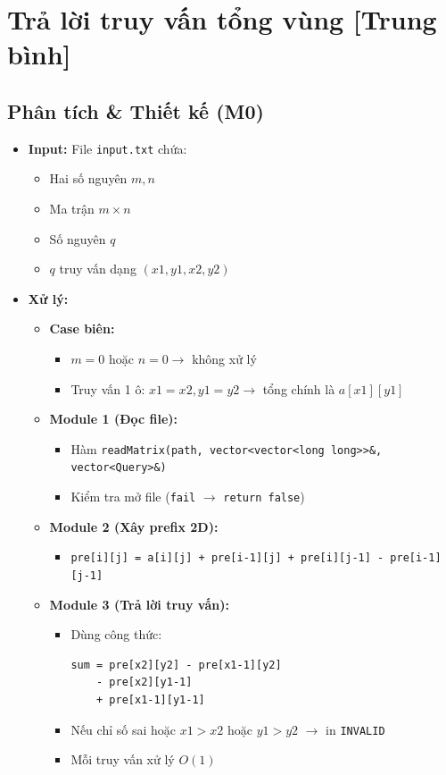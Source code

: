 \section{Trả lời truy vấn tổng vùng [Trung bình]}
\subsection{Phân tích \& Thiết kế (M0)}
\begin{itemize}
    \item \textbf{Input:}
    File \texttt{input.txt} chứa:
    \begin{itemize}
        \item Hai số nguyên $m, n$
        \item Ma trận $m \times n$
        \item Số nguyên $q$
        \item $q$ truy vấn dạng $(x1,y1,x2,y2)$
    \end{itemize}

    \item \textbf{Xử lý:}
    \begin{itemize}
        \item \textbf{Case biên:}
        \begin{itemize}
            \item $m = 0$ hoặc $n = 0 \rightarrow$ không xử lý
            \item Truy vấn 1 ô: $x1=x2, y1=y2 \rightarrow$ tổng chính là $a[x1][y1]$
        \end{itemize}

        \item \textbf{Module 1 (Đọc file):}
        \begin{itemize}
            \item Hàm \texttt{readMatrix(path, vector<vector<long long>>\&, vector<Query>\&)}
            \item Kiểm tra mở file (\texttt{fail} $\rightarrow$ \texttt{return false})
        \end{itemize}

        \item \textbf{Module 2 (Xây prefix 2D):}
        \begin{itemize}
            \item \texttt{pre[i][j] = a[i][j] + pre[i-1][j] + pre[i][j-1] - pre[i-1][j-1]}
        \end{itemize}

        \item \textbf{Module 3 (Trả lời truy vấn):}
        \begin{itemize}
            \item Dùng công thức:
            \begin{lstlisting}
sum = pre[x2][y2] - pre[x1-1][y2]
    - pre[x2][y1-1]
    + pre[x1-1][y1-1]
            \end{lstlisting}
            \item Nếu chỉ số sai hoặc $x1>x2$ hoặc $y1>y2$ $\rightarrow$ in \texttt{INVALID}
            \item Mỗi truy vấn xử lý $O(1)$
        \end{itemize}
    \end{itemize}


\end{itemize}

